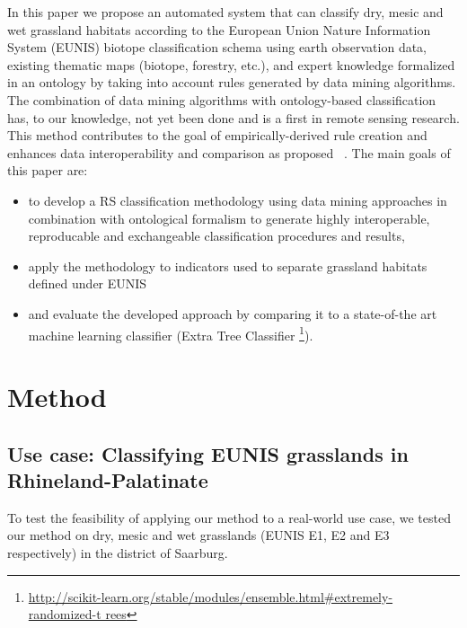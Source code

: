 \documentclass[authoryear,preprint,12pt,number]{elsarticle}
\begin{document}
In this paper we propose an automated system that can classify dry, mesic and
wet grassland habitats according to the European Union Nature Information System
(EUNIS) biotope classification schema using earth observation data, existing
thematic maps (biotope, forestry, etc.), and expert knowledge formalized in an
ontology by taking into account rules generated by data mining algorithms. The
combination of data mining algorithms with ontology-based classification has, to
our knowledge, not yet been done and is a first in remote sensing research.
This method contributes to the goal of empirically-derived rule creation and
enhances data interoperability and comparison as proposed ~\cite{Janowicz2012}.
The main goals of this paper are:
\begin{itemize}
 \item to develop a RS classification methodology using data mining approaches
     in combination with ontological formalism to generate highly interoperable,
     reproducable and exchangeable classification procedures and results,
 \item apply the methodology to indicators used to separate grassland habitats
     defined under EUNIS
 \item and evaluate the developed approach by comparing it to a state-of-the art
     machine learning classifier (Extra Tree 
Classifier 
\footnote{\url{
http://scikit-learn.org/stable/modules/ensemble.html\#extremely-randomized-t
rees}}).
\end{itemize}
\section{Method}
\subsection{Use case: Classifying EUNIS grasslands in Rhineland-Palatinate}
\label{sec:usecase_data}
To test the feasibility of applying our method to a real-world use case, we 
tested our method on dry, mesic and wet grasslands (EUNIS E1, E2 and E3 
respectively) in the district of Saarburg. 
\end{document}
